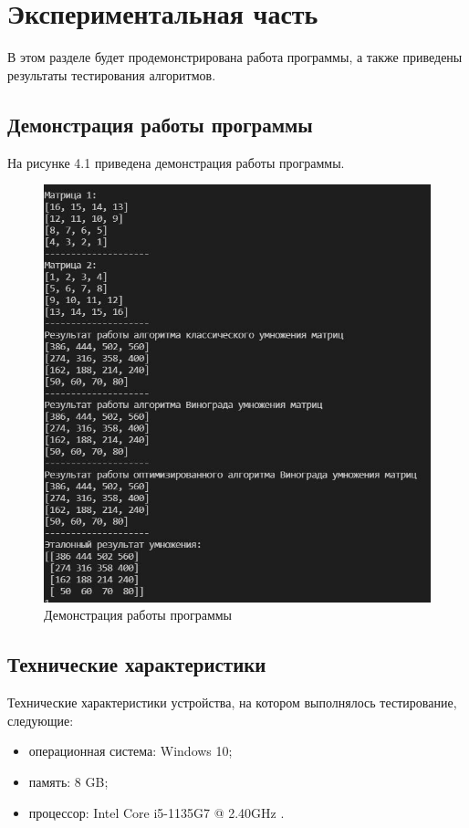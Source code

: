\chapter{Экспериментальная часть}
В этом разделе будет продемонстрирована работа программы, а также
приведены результаты тестирования алгоритмов.

\section{Демонстрация работы программы}
На рисунке 4.1 приведена демонстрация работы программы.

\FloatBarrier
\begin{figure}[h]
	\begin{center}
		\includegraphics[]{inc/demostrate.jpg}
	\end{center}
	\caption{Демонстрация работы программы}
\end{figure}
\FloatBarrier

\section{Технические характеристики}
Технические характеристики устройства, на котором выполнялось тестирование, следующие:
\begin{itemize}
	\item операционная система: Windows 10;
	\item память: 8 GB;
	\item процессор: Intel Core i5-1135G7 @ 2.40GHz \cite{intel}.
\end{itemize}

